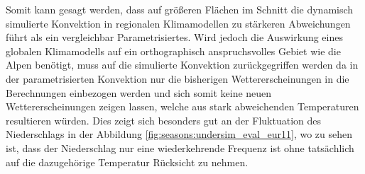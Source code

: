 Somit kann gesagt werden, dass auf größeren Flächen im Schnitt die dynamisch simulierte Konvektion in regionalen Klimamodellen zu stärkeren Abweichungen führt als ein vergleichbar Parametrisiertes. Wird jedoch die Auswirkung eines globalen Klimamodells auf ein orthographisch anspruchsvolles Gebiet wie die Alpen benötigt, muss auf die simulierte Konvektion zurückgegriffen werden da in der parametrisierten Konvektion nur die bisherigen Wettererscheinungen in die Berechnungen einbezogen werden und sich somit keine neuen Wettererscheinungen zeigen lassen, welche aus stark abweichenden Temperaturen resultieren würden. Dies zeigt sich besonders gut an der Fluktuation des Niederschlags in der Abbildung \ref{fig:seasons:undersim_eval_eur11}, wo zu sehen ist, dass der Niederschlag nur eine wiederkehrende Frequenz ist ohne tatsächlich auf die dazugehörige Temperatur Rücksicht zu nehmen.\\
